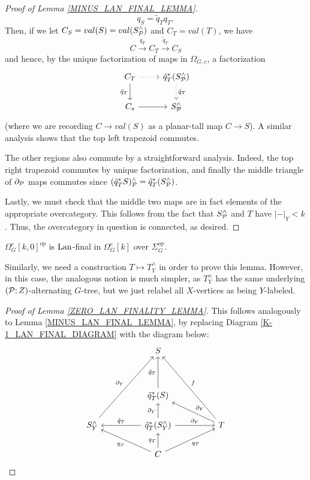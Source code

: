 \documentclass[a4paper,10pt]{article}%
\begin{document}
\begin{proof}[Proof of Lemma \ref{MINUS_LAN_FINAL_LEMMA}]
  \[
  q_S = \tilde q_T q_T,
  \]
  Then, if we let $C_S = val(S) = val(S^\wedge_\P)$ and $C_T = val(T)$, we have
  \[
  C \xrightarrow{q_T} C_T \xrightarrow{\tilde q_T} C_S
  \]
  and hence, by the unique factorization of maps in $\Omega_{G,e}$, a factorization%
  \[
  \begin{tikzcd}
    C_T \arrow[d, "\tilde q_T"'] \arrow[r, dotted] & \tilde q_T^*(S^\wedge_\P) \arrow[d, dotted, "\tilde q_T"]\\
    C_s \arrow[r] & S^\wedge_\P
  \end{tikzcd}
  \]
  (where we are recording $C \to val(S)$ as a planar-tall map $C \to S$). 
  A similar analysis shows that the top left trapezoid commutes. 

  The other regions also commute by a straightforward analysis. Indeed, the top right trapezoid commutes by unique factorization, and finally the middle triangle of $\partial_\P$ maps commutes since $(\tilde q_T^*S)^\wedge_\P = \tilde q^*_T(S^\wedge_\P)$. 
  
  Lastly, we must check that the middle two maps are in fact elements of the appropriate overcategory. This follows from the fact that $S^\wedge_\P$ and $T$ have $|-|_Y < k$. Thus, the overcategory in question is connected, as desired.
\end{proof}


\begin{lemma}
  \label{ZERO_LAN_FINALITY_LEMMA}
  $\Omega_G^{e}[k,0]^{op}$ is $\Lan$-final in $\Omega_G^e[k]$ over $\Sigma_G^{op}$.
\end{lemma}

Similarly, we need a construction $T \mapsto T^\wedge_Y$ in order to prove this lemma. However, in this case, the analogous notion is much simpler, as $T^\wedge_Y$ has the same underlying $(\P;Z)$-alternating $G$-tree, but we just relabel all $X$-vertices as being $Y$-labeled.

\begin{proof}[Proof of Lemma \ref{ZERO_LAN_FINALITY_LEMMA}]
  This follows analogously to Lemma \ref{MINUS_LAN_FINAL_LEMMA}, by replacing Diagram \ref{K-1_LAN_FINAL_DIAGRAM} with the diagram below:
  \[
  \begin{tikzcd}
    && S & \\[20pt]
    &&\tilde q_T^*(S) \arrow[u, "\tilde q_T"]\\
    S^\wedge_Y \arrow[uurr, "\partial_Y"] && \tilde q_T^*(S^\wedge_Y) \arrow[ll, "\tilde q_T"'] \arrow[u, "\partial_Y"] \arrow[rr, "\partial_Y"] && T \arrow[ull, "\partial_Y"'] \arrow[uull, "f"']\\
    && C \arrow[ull, "q_S"] \arrow[u, "q_T"] \arrow[urr, "q_T"'] 
  \end{tikzcd}
  \]
\end{proof}
\end{document}
